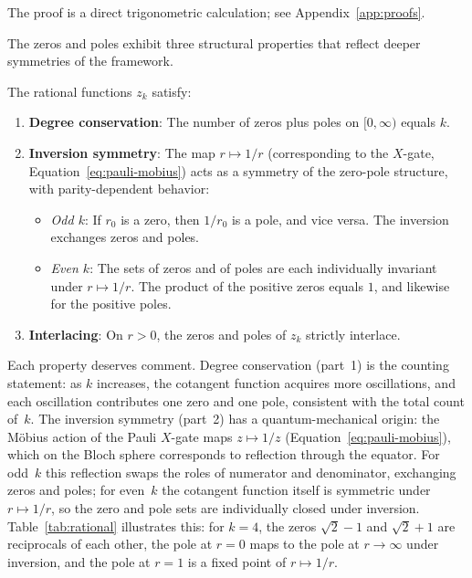 The proof is a direct trigonometric calculation; see
Appendix~\ref{app:proofs}.

The zeros and poles exhibit three structural properties that
reflect deeper symmetries of the framework.

\begin{corollary}
	\label{cor:structure}
	The rational functions $z_k$ satisfy:
	\begin{enumerate}
		\item \textbf{Degree conservation}: The number of zeros plus poles on $[0,\infty)$ equals $k$.
		\item \textbf{Inversion symmetry}: The map $r \mapsto 1/r$ (corresponding to the $X$-gate, Equation~\eqref{eq:pauli-mobius}) acts as a symmetry of the zero-pole structure, with parity-dependent behavior:
		      \begin{itemize}
			      \item \textit{Odd $k$}: If $r_0$ is a zero, then $1/r_0$ is a pole, and vice versa. The inversion exchanges zeros and poles.
			      \item \textit{Even $k$}: The sets of zeros and of poles are each individually invariant under $r \mapsto 1/r$. The product of the positive zeros equals $1$, and likewise for the positive poles.
		      \end{itemize}
		\item \textbf{Interlacing}: On $r > 0$, the zeros and poles of $z_k$ strictly interlace.
	\end{enumerate}
\end{corollary}

Each property deserves comment.  Degree conservation (part~1)
is the counting statement: as $k$ increases, the cotangent
function acquires more oscillations, and each oscillation
contributes one zero and one pole, consistent with the total
count of~$k$.  The inversion symmetry (part~2) has a
quantum-mechanical origin: the M\"obius action of the Pauli
$X$-gate maps $z \mapsto 1/z$
(Equation~\eqref{eq:pauli-mobius}), which on the Bloch sphere
corresponds to reflection through the equator.  For odd~$k$
this reflection swaps the roles of numerator and denominator,
exchanging zeros and poles; for even~$k$ the cotangent function
itself is symmetric under $r \mapsto 1/r$, so the zero and
pole sets are individually closed under inversion.  Table~\ref{tab:rational}
illustrates this: for $k=4$, the zeros $\sqrt{2}-1$ and
$\sqrt{2}+1$ are reciprocals of each other, the pole at
$r=0$ maps to the pole at $r \to \infty$ under inversion,
and the pole at $r=1$ is a fixed point of $r \mapsto 1/r$.

